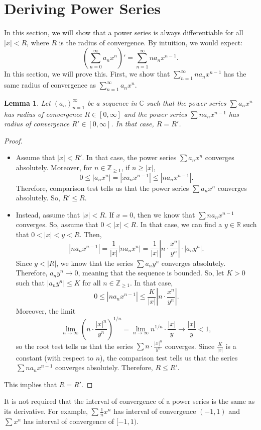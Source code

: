 \documentclass[a4paper, openany]{memoir}
\theoremstyle{definition}
\theoremstyle{plain}
\newtheorem{lemma}[definition]{Lemma}
\begin{document}
\section{Deriving Power Series}
In this section, we will show that a power series is always differentiable for all $|x| < R$, where $R$ is the radius of convergence. By intuition, we would expect:
\[\left(\sum_{n=0}^{\infty} a_n x^n\right)' = \sum_{n=1}^{\infty} na_n x^{n-1}.\]
In this section, we will prove this. First, we show that $\sum_{n=1}^{\infty} na_n x^{n-1}$ has the same radius of convergence as $\sum_{n=1}^{\infty} a_n x^n$.
\begin{lemma}
Let $(a_n)_{n=1}^{\infty}$ be a sequence in $\mathbb{C}$ such that the power series $\sum a_n x^n$ has radius of convergence $R \in [0, \infty]$ and the power series $\sum n a_n x^{n-1}$ has radius of convergence $R' \in [0, \infty]$. In that case, $R = R'$.
\end{lemma}
\begin{proof}
\hspace*{0pt}
\begin{itemize}
    \item Assume that $|x| < R'$. In that case, the power series $\sum a_n x^n$ converges absolutely. Moreover, for $n \in \mathbb{Z}_{\geqslant 1}$, if $n \geqslant |x|$,
    \[0 \leqslant |a_n x^n| = |x a_n x^{n-1}| \leqslant |n a_n x^{n-1}|.\]
    Therefore, comparison test tells us that the power series $\sum a_n x^n$ converges absolutely. So, $R' \leqslant R$.
    
    \item Instead, assume that $|x| < R$. If $x = 0$, then we know that $\sum na_n x^{n-1}$ converges. So, assume that $0 < |x| < R$. In that case, we can find a $y \in \mathbb{R}$ such that $0 < |x| < y < R$. Then, 
    \[|n a_n x^{n-1}| = \frac{1}{|x|} |n a_n x^n| = \frac{1}{|x|} \left|n \cdot \frac{x^n}{y^n}\right| \cdot |a_n y^n|.\]
    Since $y < |R|$, we know that the series $\sum a_n y^n$ converges absolutely. Therefore, $a_n y^n \to 0$, meaning that the sequence is bounded. So, let $K > 0$ such that $|a_n y^n| \leqslant K$ for all $n \in \mathbb{Z}_{\geqslant 1}$. In that case,
    \[0 \leqslant |n a_n x^{n-1}| \leqslant \frac{K}{|x|} \left|n \cdot \frac{x^n}{y^n}\right|.\]
    Moreover, the limit
    \[\lim_{n \to \infty} \left(n \cdot \frac{|x|^n}{y^n}\right)^{1/n} = \lim_{n \to \infty} n^{1/n} \cdot \frac{|x|}{y} \to \frac{|x|}{y} < 1,\]
    so the root test tells us that the series $\sum n \cdot \frac{|x|^n}{y^n}$ converges. Since $\frac{K}{|x|}$ is a constant (with respect to $n$), the comparison test tells us that the series $\sum na_n x^{n-1}$ converges absolutely. Therefore, $R \leqslant R'$.
\end{itemize}
This implies that $R = R'$.
\end{proof}
\noindent It is not required that the interval of convergence of a power series is the same as its derivative. For example, $\sum \frac{1}{n} x^n$ has interval of convergence $(-1, 1)$ and $\sum x^n$ has interval of convergence of $[-1, 1)$.
\end{document}
